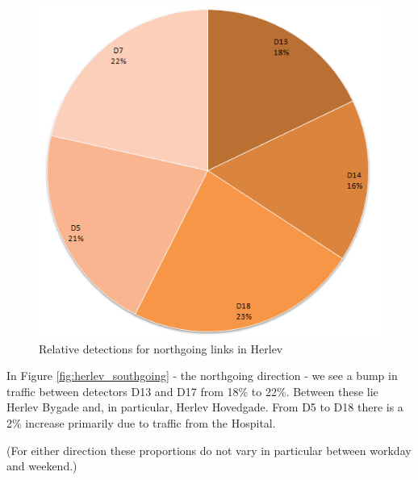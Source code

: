 \begin{figure}[!ht]
\begin{center}
\includegraphics[scale=0.4]{herlev_northgoing_detectors.png} 
\end{center}
\caption{Relative detections for northgoing links in Herlev}
\label{fig:herlev_northgoing}
\end{figure}

In Figure \ref{fig:herlev_southgoing} - the northgoing direction - we see a bump in traffic between detectors D13 and D17 from 18\% to 22\%. Between these lie Herlev Bygade and, in particular, Herlev Hovedgade. From D5 to D18 there is a 2\% increase primarily due to traffic from the Hospital.

(For either direction these proportions do not vary in particular between workday and weekend.)

